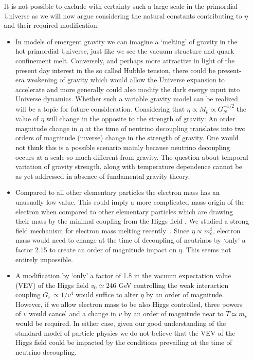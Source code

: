 It is not possible to exclude with certainty such a large scale in the primordial Universe as we will now argue considering the natural constants contributing to $\eta$ and their required
modification:
\begin{itemize}
\item
In models of emergent gravity we can imagine a `melting' of gravity in the hot primordial Universe, just like we see the vacuum structure and quark confinement melt. Conversely, and perhaps more attractive in light of the present day interest in the so called Hubble tension, there could be present-era weakening of gravity which would allow the Universe expansion to accelerate and more generally could also modify the dark energy input into Universe dynamics. Whether such a variable gravity model can be realized will be a topic for future consideration. Considering that $\eta\propto M_p\propto G_N^{-1/2}$ the value of $\eta$ will change in the opposite to the strength of gravity: An order magnitude change in $\eta$ at the time of neutrino decoupling translates into two orders of magnitude (inverse) change in the strength of gravity. One would not think this is a possible scenario mainly because neutrino decoupling occurs at a scale so much different from gravity. The question about temporal variation of gravity strength, along with temperature dependence cannot be as yet addressed in absence of fundamental gravity theory. 
\item
Compared to all other elementary particles the electron mass has an unusually low value. This could imply a more complicated mass origin of the electron when compared to other elementary particles which are drawing their mass by the minimal coupling from the Higgs field . We studied a strong field mechanism for electron mass melting recently~\cite{Evans:2019zyk}. Since $\eta\propto m_e^3$, electron mass would need to change at the time of decoupling of neutrinos by `only' a factor 2.15 to create an order of magnitude impact on $\eta$. This seems not entirely impossible.
\item
A modification by `only' a factor of 1.8 in the vacuum expectation value (VEV) of the Higgs field $v_0\simeq 246$ GeV controlling the weak interaction coupling $G_\mathrm{F}\propto 1/v^4$ would suffice to alter $\eta$ by an order of magnitude. However, if we allow electron mass to be also Higgs controlled, three powers of $v$ would cancel and a change in $v$ by an order of magnitude near to $T\simeq m_e$ would be required. In either case, given our good understanding of the standard model of particle physics we do not believe that the VEV of the Higgs field could be impacted by the conditions prevailing at the time of neutrino decoupling.
\end{itemize}
